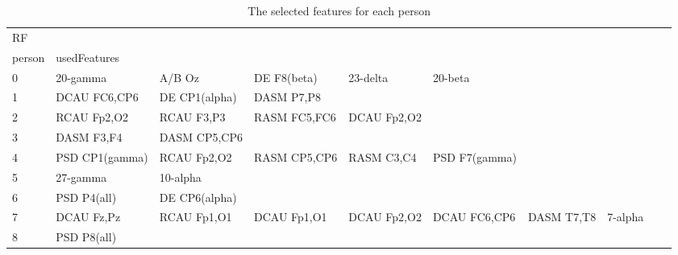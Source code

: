 \begin{landscape}
\begin{table}[]
\centering
\caption{The selected features for each person}
\begin{tabular}{l|llllllll}
RF       &                &                &                &                &                &                &               &                &               &               \\
person   & usedFeatures   &                &                &                &                &                &               &                &               &               \\
0        & 20-gamma       & A/B Oz         & DE F8(beta)    & 23-delta       & 20-beta        &                &               &                &               &               \\
1        & DCAU FC6,CP6   & DE CP1(alpha)  & DASM P7,P8     &                &                &                &               &                &               &               \\
2        & RCAU Fp2,O2    & RCAU F3,P3     & RASM FC5,FC6   & DCAU Fp2,O2    &                &                &               &                &               &               \\
3        & DASM F3,F4     & DASM CP5,CP6   &                &                &                &                &               &                &               &               \\
4        & PSD CP1(gamma) & RCAU Fp2,O2    & RASM CP5,CP6   & RASM C3,C4     & PSD F7(gamma)  &                &               &                &               &               \\
5        & 27-gamma       & 10-alpha       &                &                &                &                &               &                &               &               \\
6        & PSD P4(all)    & DE CP6(alpha)  &                &                &                &                &               &                &               &               \\
7        & DCAU Fz,Pz     & RCAU Fp1,O1    & DCAU Fp1,O1    & DCAU Fp2,O2    & DCAU FC6,CP6   & DASM T7,T8     & 7-alpha       &                &               &               \\
8        & PSD P8(all)    &                &                &                &                &                &               &                &               &               \\

\end{tabular}
\end{table}
\end{landscape}
